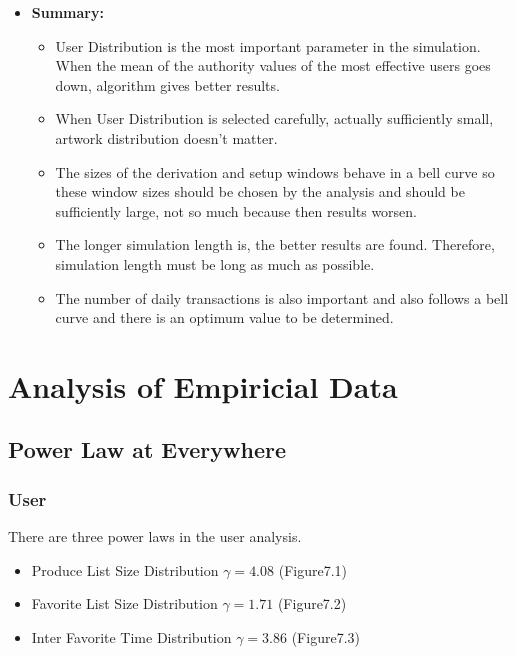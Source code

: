 \documentclass[12pt,a4paper]{report}
\begin{document}
	\begin{itemize}

	\item \textbf{Summary:}

		\begin{itemize}

		\item User Distribution is the most important parameter in the simulation. When the mean of the authority values of the most effective users goes down, algorithm gives better results.

		\item When User Distribution is selected carefully, actually sufficiently small, artwork distribution doesn't matter.

		\item The sizes of the derivation and setup windows behave in a bell curve so these window sizes should be chosen by the analysis and should be sufficiently large, not so much because then results worsen.

		\item The longer simulation length  is, the better results are found. Therefore,  simulation length must be long as much as possible.

		\item The number of daily transactions is also important and also follows a bell curve and there is an optimum value to be determined. 

		\end{itemize}

	\end{itemize}

\chapter{Analysis of Empiricial Data}

	\section{Power Law at Everywhere}

	\subsection{User}

	There are three power laws in the user analysis.

	\begin{itemize}
	\item Produce List Size Distribution $\gamma = 4.08$ (Figure7.1)
	\item Favorite List Size Distribution $\gamma = 1.71$ (Figure7.2)
	\item Inter Favorite Time Distribution $\gamma = 3.86$ (Figure7.3)
	\end{itemize}
	
\end{document}
